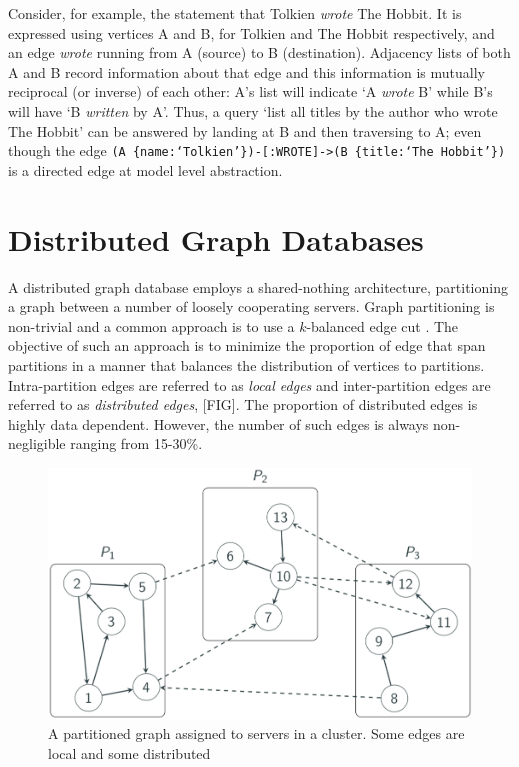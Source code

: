 \documentclass[sigplan,screen]{acmart}
\begin{document}
Consider, for example, the statement that Tolkien \textit{wrote} The Hobbit. It is expressed using vertices A and B, for Tolkien and The Hobbit respectively, and an edge \textit{wrote} running from A (source) to B (destination). Adjacency lists of both A and B record information about that edge and this information is mutually reciprocal (or inverse) of each other: A's list will indicate `A \textit{wrote} B' while B's will have `B \textit{written} by A'. Thus, a query `list all titles by the author who wrote The Hobbit' can be answered by landing at B and then traversing to A; even though the edge \texttt{(A \{name:`Tolkien'\})-[:WROTE]->(B \{title:`The Hobbit'\})} is a directed edge at model level abstraction.

\section{Distributed Graph Databases}

A distributed graph database employs a shared-nothing architecture, partitioning a graph between a number of loosely cooperating servers. Graph partitioning is non-trivial and a common approach is to use a $k$-balanced edge cut \cite{Huang2016}. The objective of such an approach is to minimize the proportion of edge that span partitions in a manner that balances the distribution of vertices to partitions. Intra-partition edges are referred to as \textit{local edges} and inter-partition edges are referred to as \textit{distributed edges}, [FIG]. The proportion of distributed edges is highly data dependent. However, the number of such edges is always non-negligible ranging from 15-30\%.

\begin{figure}[h]
  \centering
  \includegraphics[width=\linewidth]{./images/dist-graph}
  \caption{A partitioned graph assigned to servers in a cluster. Some edges are local and some distributed}
  \label{dist-graph}
\end{figure}
\end{document}
